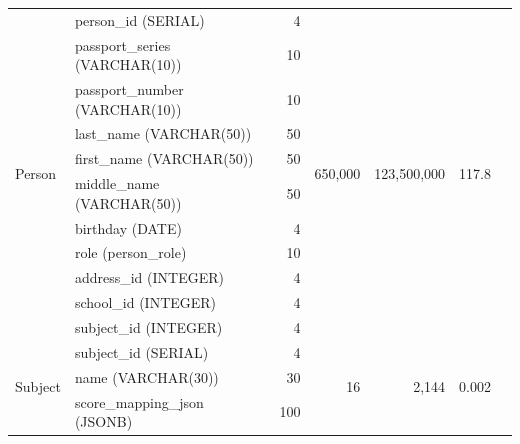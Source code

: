 \documentclass[a4paper]{article}
\begin{document}
\begin{longtable}{|l|p{2cm}|r|r|r|r|r|}
      \multirow{11}{*}{Person}
                        & person\_id (SERIAL)            & 4                     & \multirow{11}{*}{650,000}  & \multirow{11}{*}{123,500,000} & \multirow{11}{*}{117.8}  \\
                        & passport\_series (VARCHAR(10)) & 10                    &                            &                               &                          \\
                        & passport\_number (VARCHAR(10)) & 10                    &                            &                               &                          \\
                        & last\_name (VARCHAR(50))       & 50                    &                            &                               &                          \\
                        & first\_name (VARCHAR(50))      & 50                    &                            &                               &                          \\
                        & middle\_name (VARCHAR(50))     & 50                    &                            &                               &                          \\
                        & birthday (DATE)                & 4                     &                            &                               &                          \\
                        & role (person\_role)            & 10                    &                            &                               &                          \\
                        & address\_id (INTEGER)          & 4                     &                            &                               &                          \\
                        & school\_id (INTEGER)           & 4                     &                            &                               &                          \\
                        & subject\_id (INTEGER)          & 4                     &                            &                               &                          \\ \hline

      \multirow{3}{*}{Subject}
                        & subject\_id (SERIAL)           & 4                     & \multirow{3}{*}{16}        & \multirow{3}{*}{2,144}        & \multirow{3}{*}{0.002}   \\
                        & name (VARCHAR(30))             & 30                    &                            &                               &                          \\
                        & score\_mapping\_json (JSONB)   & 100                   &                            &                               &                          \\ \hline


\end{longtable}
\end{document}
